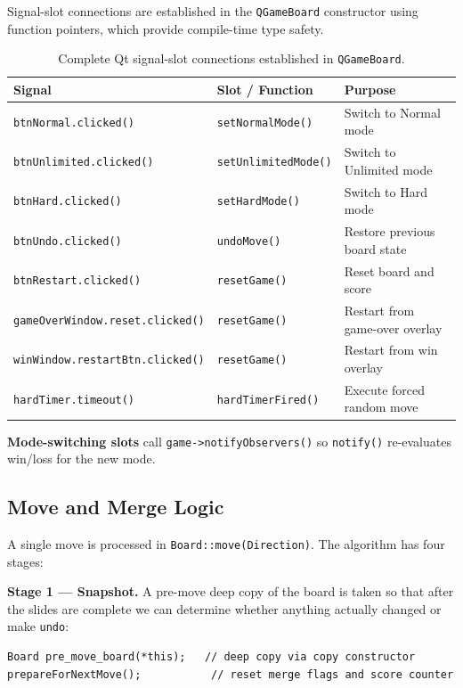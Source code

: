 \documentclass[a4paper,12pt]{article}
\begin{document}
Signal-slot connections are established in the \texttt{QGameBoard} constructor using function pointers, which provide compile-time type safety.
\begin{table}[H]
\centering
\begin{tabular}{|l|l|l|}
\hline
\textbf{Signal} & \textbf{Slot / Function} & \textbf{Purpose} \\
\hline
\texttt{btnNormal.clicked()} & \texttt{setNormalMode()} & Switch to Normal mode \\
\hline
\texttt{btnUnlimited.clicked()} & \texttt{setUnlimitedMode()} & Switch to Unlimited mode \\
\hline
\texttt{btnHard.clicked()} & \texttt{setHardMode()} & Switch to Hard mode \\
\hline
\texttt{btnUndo.clicked()} & \texttt{undoMove()} & Restore previous board state \\
\hline
\texttt{btnRestart.clicked()} & \texttt{resetGame()} & Reset board and score \\
\hline
\texttt{gameOverWindow.reset.clicked()} & \texttt{resetGame()} & Restart from game-over overlay \\
\hline
\texttt{winWindow.restartBtn.clicked()} & \texttt{resetGame()} & Restart from win overlay \\
\hline
\texttt{hardTimer.timeout()} & \texttt{hardTimerFired()} & Execute forced random move \\
\hline
\end{tabular}
\caption{Complete Qt signal-slot connections established in \texttt{QGameBoard}.}
\end{table}

\textbf{Mode-switching slots} call \texttt{game->notifyObservers()} so \texttt{notify()} re-evaluates win/loss for the new mode. 

\subsection{Move and Merge Logic}
\label{sec:move}

A single move is processed in \texttt{Board::move(Direction)}. The algorithm has four stages:

\textbf{Stage 1 --- Snapshot.} A pre-move deep copy of the board is taken so that after the slides are complete we can determine whether anything actually changed or make \texttt{undo}:

\begin{lstlisting}[style=CppStyle, caption={Pre-move snapshot in \texttt{Board::move()}}]
Board pre_move_board(*this);   // deep copy via copy constructor
prepareForNextMove();           // reset merge flags and score counter
\end{lstlisting}
\end{document}
